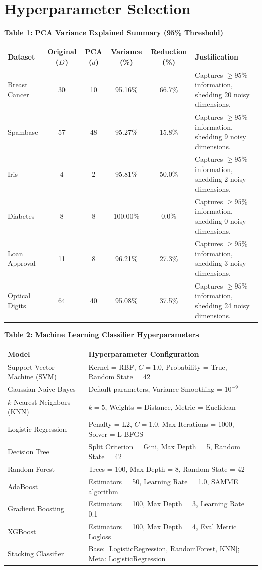 \documentclass[12pt,a4paper]{article}
\begin{document}
\section{Hyperparameter Selection}

\textbf{Table 1: PCA Variance Explained Summary (95\% Threshold)}
\begin{table}[H]
\centering
\small
\begin{tabular}{lccccp{5cm}}
\toprule
\textbf{Dataset} & \textbf{Original ($D$)} & \textbf{PCA ($d$)} & \textbf{Variance (\%)} & \textbf{Reduction (\%)} & \textbf{Justification} \\
\midrule
Breast Cancer & 30 & 10 & 95.16\% & 66.7\% & Captures $\ge 95\%$ information, shedding 20 noisy dimensions. \\
Spambase & 57 & 48 & 95.27\% & 15.8\% & Captures $\ge 95\%$ information, shedding 9 noisy dimensions. \\
Iris & 4 & 2 & 95.81\% & 50.0\% & Captures $\ge 95\%$ information, shedding 2 noisy dimensions. \\
Diabetes & 8 & 8 & 100.00\% & 0.0\% & Captures $\ge 95\%$ information, shedding 0 noisy dimensions. \\
Loan Approval & 11 & 8 & 96.21\% & 27.3\% & Captures $\ge 95\%$ information, shedding 3 noisy dimensions. \\
Optical Digits & 64 & 40 & 95.08\% & 37.5\% & Captures $\ge 95\%$ information, shedding 24 noisy dimensions. \\
\bottomrule
\end{tabular}
\end{table}

\textbf{Table 2: Machine Learning Classifier Hyperparameters}
\begin{table}[H]
\centering
\small
\begin{tabular}{ll}
\toprule
\textbf{Model} & \textbf{Hyperparameter Configuration} \\
\midrule
Support Vector Machine (SVM) & Kernel = RBF, $C = 1.0$, Probability = True, Random State = 42 \\
Gaussian Naive Bayes & Default parameters, Variance Smoothing = $10^{-9}$ \\
$k$-Nearest Neighbors (KNN) & $k = 5$, Weights = Distance, Metric = Euclidean \\
Logistic Regression & Penalty = L2, $C = 1.0$, Max Iterations = 1000, Solver = L-BFGS \\
Decision Tree & Split Criterion = Gini, Max Depth = 5, Random State = 42 \\
Random Forest & Trees = 100, Max Depth = 8, Random State = 42 \\
AdaBoost & Estimators = 50, Learning Rate = 1.0, SAMME algorithm \\
Gradient Boosting & Estimators = 100, Max Depth = 3, Learning Rate = 0.1 \\
XGBoost & Estimators = 100, Max Depth = 4, Eval Metric = Logloss \\
Stacking Classifier & Base: [LogisticRegression, RandomForest, KNN]; Meta: LogisticRegression \\
\bottomrule
\end{tabular}
\end{table}
\end{document}
